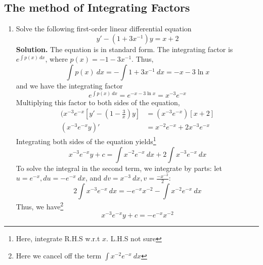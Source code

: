 \documentclass{article}
\begin{document}
\subsection{The method of Integrating Factors}
\begin{enumerate}
    \item Solve the following first-order linear differential equation
    \begin{equation}
        y'-(1+3x^{-1})y=x+2
    \end{equation}
    \textbf{Solution.} The equation is in standard form. The integrating factor is $e^{\int p(x)~dx}$, where $p(x)=-1-3x^{-1}$. Thus,
    \begin{equation*}
        \int p(x)~dx=-\int 1+3x^{-1}~dx=-x-3\ln x
    \end{equation*}
    and we have the integrating factor
    \begin{equation*}
        e^{\int p(x)~dx}=e^{-x-3\ln x}=x^{-3}e^{-x}
    \end{equation*}
    Multiplying this factor to both sides of the equation,
    \begin{align*}
        (x^{-3}e^{-x}[y'-(1-\frac{3}{x})y]&=(x^{-3}e^{-x})[x+2] \\
        (x^{-3}e^{-x}y)'&=x^{-2}e^{-x}+2x^{-3}e^{-x}
    \end{align*}
    Integrating both sides of the equation yields\footnote{Here, integrate R.H.S w.r.t $x$. L.H.S not sure}
    \begin{equation*}
        x^{-3}e^{-x}y+c=\int x^{-2}e^{-x}~dx+2\int x^{-3}e^{-x}~dx
    \end{equation*}
    To solve the integral in the second term, we integrate by parts: let $u=e^{-x},du=-e^{-x}~dx$, and $dv=x^{-3}~dx, v=\frac{-x^{-2}}{2}$:
    \begin{equation*}
        2\int x^{-3}e^{-x}~dx=-e^{-x}x^{-2}-\int x^{-2}e^{-x}~dx
    \end{equation*}
    Thus, we have\footnote{Here we cancel off the term $\int x^{-2}e^{-x}~dx$}
    \begin{equation*}
        x^{-3}e^{-x}y+c=-e^{-x}x^{-2}
    \end{equation*}
\end{enumerate}
\end{document}
